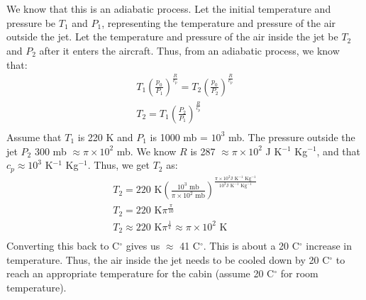 \documentclass[11pt,a4paper,margin=1in]{article}
\begin{document}
\section{}
We know that this is an adiabatic process. Let the initial temperature and pressure
be $T_1$ and $P_1$, representing the temperature and pressure of the air outside
the jet. Let the temperature and pressure of the air inside the jet be $T_2$ 
and $P_2$ after it enters the aircraft. Thus, from an adiabatic process, we know 
that:
\begin{gather*}
    T_1 \left( \frac{p_0}{P_1} \right)^{\frac{R}{c_p}} = T_2 \left( \frac{p_0}{P_2} 
    \right)^{\frac{R}{c_p}}\\
    T_2 = T_1 \left( \frac{P_2}{P_1} \right)^{\frac{R}{c_p}}\\
\end{gather*}
Assume that $T_1$ is 220 K and $P_1$ is 1000 mb = $10^3$ mb. The pressure outside 
the jet $P_2$ 300 mb $\approx \pi \times 10^2$ mb. We know $R$ is 287 $\approx 
\pi \times 10^2$ J K$^{-1}$ Kg$^{-1}$, and that $c_p \approx 10^3$ K$^{-1}$ 
Kg$^{-1}$. Thus, we get $T_2$ as:
\begin{gather*}
    T_2 = 220 \text{ K} \left( \frac{10^3 \text{ mb}}
        {\pi \times 10^2 \text{ mb}} \right)^{\frac{\pi \times 10^2 \text{J K}^{-1} 
        \text{ Kg}^{-1}}{10^3 \text{J K}^{-1}\text{ Kg}^{-1}}}\\
    T_2 = 220 \text{ K} \pi^{\frac{\pi}{10}}\\
    T_2 \approx 220 \text{ K} \pi^{\frac{1}{\pi}} \approx \pi \times 10^2 \text{ K}\\
\end{gather*}
Converting this back to C$^{\circ}$ gives us $\approx$ 41 C$^{\circ}$. This is
about a 20 C$^{\circ}$ increase in temperature. Thus, the air inside the jet needs
to be cooled down by 20 C$^{\circ}$ to reach an appropriate temperature for the
cabin (assume 20 C$^{\circ}$ for room temperature). 
\end{document}
